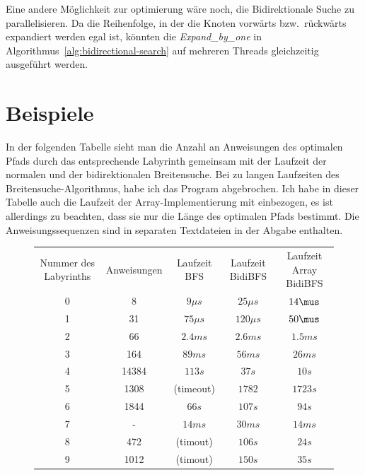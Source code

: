 \documentclass[a4paper,10pt,ngerman]{scrartcl}
\begin{document}
    Eine andere Möglichkeit zur optimierung wäre noch, die Bidirektionale Suche zu parallelisieren.
    Da die Reihenfolge, in der die Knoten vorwärts bzw.\ rückwärts expandiert werden egal ist, könnten die \textit{Expand\_by\_one} in Algorithmus~\ref{alg:bidirectional-search} auf mehreren Threads gleichzeitig ausgeführt werden.


    \section{Beispiele}
    In der folgenden Tabelle sieht man die Anzahl an Anweisungen des optimalen Pfads durch das entsprechende Labyrinth gemeinsam mit der Laufzeit der normalen und der bidirektionalen Breitensuche.
    Bei zu langen Laufzeiten des Breitensuche-Algorithmus, habe ich das Program abgebrochen.
    Ich habe in dieser Tabelle auch die Laufzeit der Array-Implementierung mit einbezogen, es ist allerdings zu beachten, dass sie nur die Länge des optimalen Pfads bestimmt.
    Die Anweisungssequenzen sind in separaten Textdateien in der Abgabe enthalten.
    \begin{figure}[H]
        \centering
        \begin{tabular}{||c | c | c | c | c ||}
            Nummer des Labyrinths & Anweisungen & Laufzeit BFS & Laufzeit BidiBFS & Laufzeit Array BidiBFS \\
            0                     & 8           & $9 \mu s$    & $25 \mu s$       & $14\mus$               \\
            \hline
            1                     & 31          & $75 \mu s$   & $120 \mu s$      & $50\mus$               \\
            \hline
            2                     & 66          & $2.4 ms$     & $2.6 ms$         & $1.5ms$                \\
            \hline
            3                     & 164         & $89 ms$      & $56 ms$          & $26ms$                 \\
            \hline
            4                     & 14384       & $113 s$      & $37 s$           & $10s$                  \\
            \hline
            5                     & 1308        & (timeout)    & $1782$           & $1723s$                 \\
            \hline
            6                     & 1844        & $66 s$       & $107 s$          & $94s$                  \\
            \hline
            7                     & -           & $14ms$       & $30ms$           & $14ms$                 \\
            \hline
            8                     & 472         & (timout)     & $106 s$          & $24s$                  \\
            \hline
            9                     & 1012        & (timout)     & $150 s$          & $35s$                  \\
        \end{tabular}
    \end{figure}
\end{document}

